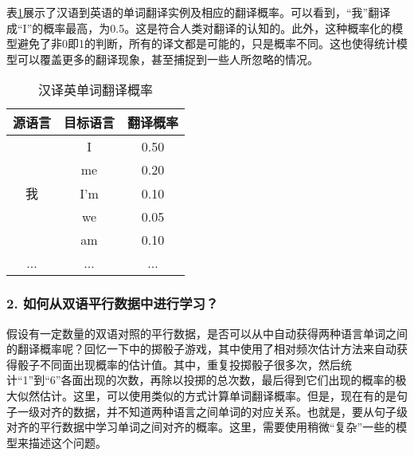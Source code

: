\parinterval 表\ref{tab:5-1}展示了汉语到英语的单词翻译实例及相应的翻译概率。可以看到，“我”翻译成“I”的概率最高，为0.5。这是符合人类对翻译的认知的。此外，这种概率化的模型避免了非0即1的判断，所有的译文都是可能的，只是概率不同。这也使得统计模型可以覆盖更多的翻译现象，甚至捕捉到一些人所忽略的情况。

\begin{table}[htp]
    \centering
    \caption{汉译英单词翻译概率}
    \begin{tabular}{c | c  c}
    源语言 & 目标语言 & 翻译概率 \\ \hline
                & I              & 0.50 \\
                & me          & 0.20 \\
    我        & I'm          & 0.10 \\
                & we          & 0.05 \\
                & am         & 0.10 \\
    ...         & ...           & ... \\
    \end{tabular}
    \label{tab:5-1}
\end{table}



\subsubsection{2. 如何从双语平行数据中进行学习？}

\parinterval 假设有一定数量的双语对照的平行数据，是否可以从中自动获得两种语言单词之间的翻译概率呢？回忆一下{\chaptertwo}中的掷骰子游戏，其中使用了相对频次估计方法来自动获得骰子不同面出现概率的估计值。其中，重复投掷骰子很多次，然后统计“1”到“6”各面出现的次数，再除以投掷的总次数，最后得到它们出现的概率的极大似然估计。这里，可以使用类似的方式计算单词翻译概率。但是，现在有的是句子一级对齐的数据，并不知道两种语言之间单词的对应关系。也就是，要从句子级对齐的平行数据中学习单词之间对齐的概率。这里，需要使用稍微“复杂”一些的模型来描述这个问题。

